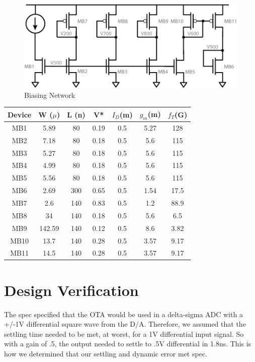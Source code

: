 \documentclass[conference]{IEEEtran}
\begin{document}
\begin{figure}[h]
\centering
\includegraphics[width=0.75\linewidth]{illus/bias}
\caption{Biasing Network}
\label{fig:bias}
\end{figure}

\begin{center}
\begin{tabular}{|c|c|c|c|c|c|c|} 
\hline
Device & W ($\mu$) & L (n) & V* & $I_D$(m) & $g_m$(m) & $f_T$(G) \\
\hline
MB1 & 5.89 & 80 & 0.19 & 0.5 & 5.27 & 128 \\
\hline
MB2 & 7.18 & 80 & 0.18 & 0.5 & 5.6 & 115 \\
\hline
MB3 & 5.27 & 80 & 0.18 & 0.5 & 5.6 & 115\\
\hline
MB4 & 4.99 & 80 & 0.18 & 0.5 & 5.6 & 115\\
\hline
MB5 & 5.56 & 80 & 0.18 & 0.5 & 5.6 & 115\\
\hline
MB6 & 2.69 & 300 & 0.65 & 0.5 & 1.54 & 17.5 \\
\hline
MB7 & 2.6 & 140 & 0.83 & 0.5 & 1.2 & 88.9 \\
\hline
MB8 & 34 & 140 & 0.18 & 0.5 & 5.6 & 6.5 \\
\hline
MB9 & 142.59 & 140 & 0.12 & 0.5 & 8.6 & 3.82 \\
\hline
MB10 & 13.7 & 140 & 0.28 & 0.5 & 3.57 & 9.17 \\
\hline
MB11 & 14.5 & 140 & 0.28 & 0.5 & 3.57 & 9.17 \\
\hline
\end{tabular}
\end{center}


\section{Design Verification}

The spec specified that the OTA would be used in a delta-sigma ADC with a +/-1V differential square wave from the D/A. Therefore, we assumed that the settling time needed to be met, at worst, for a 1V differential input signal. So with a gain of .5, the output needed to settle to .5V differential in 1.8ns. This is how we determined that our settling and dynamic error met spec.
\end{document}
